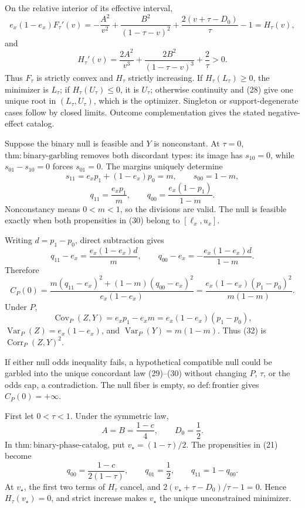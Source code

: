 On the relative interior of its effective interval,
\[
e_x(1-e_x)F_\tau'(v)
=-\frac{A^2}{v^2}+\frac{B^2}{(1-\tau-v)^2}
+\frac{2(v+\tau-D_0)}{\tau}-1=H_\tau(v), \tag{27}
\]
and
\[
H_\tau'(v)=\frac{2A^2}{v^3}+\frac{2B^2}{(1-\tau-v)^3}+\frac{2}{\tau}>0. \tag{28}
\]
Thus \(F_\tau\) is strictly convex and \(H_\tau\) strictly increasing. If \(H_\tau(L_\tau)\geq0\), the minimizer is \(L_\tau\); if \(H_\tau(U_\tau)\leq0\), it is \(U_\tau\); otherwise continuity and (28) give one unique root in \((L_\tau,U_\tau)\), which is the optimizer. Singleton or support-degenerate cases follow by closed limits. Outcome complementation gives the stated negative-effect catalog.

Suppose the binary null is feasible and \(Y\) is nonconstant. At \(\tau=0\), \(\mathrm{thm{:}binary\mbox{-}garbling}\) removes both discordant types: its image has \(s_{10}=0\), while \(s_{01}-s_{10}=0\) forces \(s_{01}=0\). The margins uniquely determine
\[
s_{11}=e_xp_1+(1-e_x)p_0=m,\qquad s_{00}=1-m, \tag{29}
\]
\[
q_{11}=\frac{e_xp_1}{m},\qquad q_{00}=\frac{e_x(1-p_1)}{1-m}. \tag{30}
\]
Nonconstancy means \(0<m<1\), so the divisions are valid. The null is feasible exactly when both propensities in (30) belong to \([\ell_x,u_x]\).

Writing \(d=p_1-p_0\), direct subtraction gives
\[
q_{11}-e_x=\frac{e_x(1-e_x)d}{m},\qquad
q_{00}-e_x=-\frac{e_x(1-e_x)d}{1-m}. \tag{31}
\]
Therefore
\[
C_P(0)
=\frac{m(q_{11}-e_x)^2+(1-m)(q_{00}-e_x)^2}{e_x(1-e_x)}
=\frac{e_x(1-e_x)(p_1-p_0)^2}{m(1-m)}. \tag{32}
\]
Under \(P\),
\[
\operatorname{Cov}_P(Z,Y)=e_xp_1-e_xm=e_x(1-e_x)(p_1-p_0),
\]
\(\operatorname{Var}_P(Z)=e_x(1-e_x)\), and \(\operatorname{Var}_P(Y)=m(1-m)\). Thus (32) is \(\operatorname{Corr}_P(Z,Y)^2\).

If either null odds inequality fails, a hypothetical compatible null could be garbled into the unique concordant law (29)--(30) without changing \(P\), \(\tau\), or the odds cap, a contradiction. The null fiber is empty, so \(\mathrm{def{:}frontier}\) gives \(C_P(0)=+\infty\).

First let \(0<\tau<1\). Under the symmetric law,
\[
A=B=\frac{1-c}{4},\qquad D_0=\frac12. \tag{33}
\]
In \(\mathrm{thm{:}binary\mbox{-}phase\mbox{-}catalog}\), put \(v_\star=(1-\tau)/2\). The propensities in (21) become
\[
q_{00}=\frac{1-c}{2(1-\tau)},\qquad q_{01}=\frac12,\qquad q_{11}=1-q_{00}. \tag{34}
\]
At \(v_\star\), the first two terms of \(H_\tau\) cancel, and \(2(v_\star+\tau-D_0)/\tau-1=0\). Hence \(H_\tau(v_\star)=0\), and strict increase makes \(v_\star\) the unique unconstrained minimizer.


